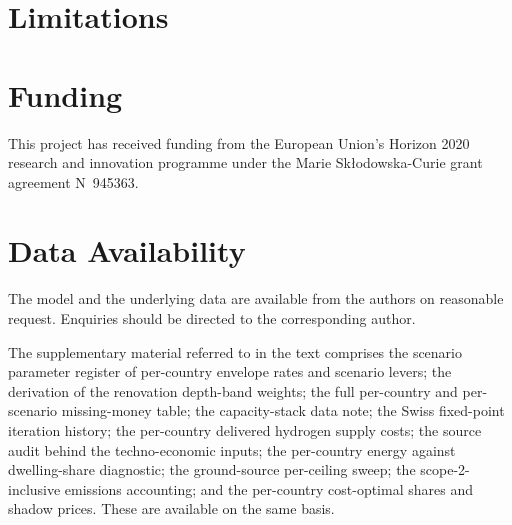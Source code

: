 \documentclass[12pt,a4paper]{article}
\begin{document}
\section{Limitations}


\section*{Funding}
This project has received funding from the European Union's Horizon 2020 research and
innovation programme under the Marie Sk\l{}odowska-Curie grant agreement
N\textdegree{}~945363.

\section*{Data Availability}
The model and the underlying data are available from the authors on reasonable request.
Enquiries should be directed to the corresponding author.

The supplementary material referred to in the text comprises the scenario parameter
register of per-country envelope rates and scenario levers; the derivation of the
renovation depth-band weights; the full per-country and per-scenario missing-money table;
the capacity-stack data note; the Swiss fixed-point iteration history; the per-country
delivered hydrogen supply costs; the source audit behind the techno-economic inputs; the
per-country energy against dwelling-share diagnostic; the ground-source per-ceiling
sweep; the scope-2-inclusive emissions accounting; and the per-country cost-optimal
shares and shadow prices. These are available on the same basis.
\end{document}
